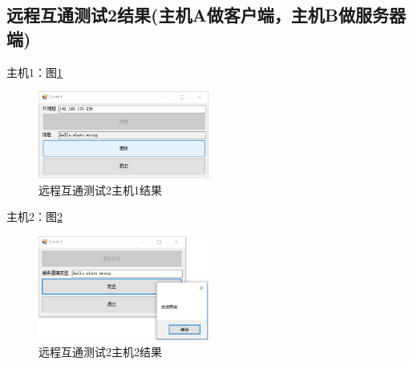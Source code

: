 \documentclass[a4paper]{ctexrep}
\begin{document}
\begin{spacing}{1.5}
\subsection{远程互通测试2结果(主机A做客户端，主机B做服务器端)}
主机1：图\ref{remote2local1}
\begin{figure}[htbp]
	\centering
	\includegraphics [width=0.5\textwidth]{figure//remote2local1.png}
	\caption{远程互通测试2主机1结果}\label{remote2local1}
\end{figure}

主机2：图\ref{remote2local2}
\begin{figure}[htbp]
	\centering
	\includegraphics [width=0.5\textwidth]{figure//remote2local2.png}
	\caption{远程互通测试2主机2结果}\label{remote2local2}
\end{figure}

\end{spacing}
\end{document}
